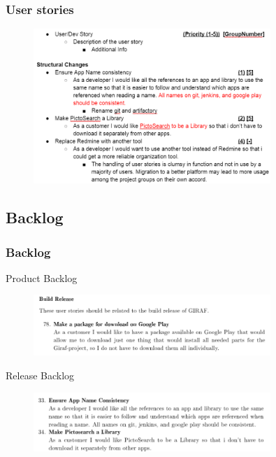\begin{frame}
	\begin{center}
		\frametitle{User stories}
		\begin{figure}[H]
			\centering
			\includegraphics[width=0.8\textwidth]{pictures/DriveStory.png}
		\end{figure}
	\end{center}
\end{frame}

\subsection{Backlog}

\begin{frame}
	\begin{center}
		\frametitle{Backlog}
		Product Backlog
		\begin{figure}[H]
			\centering
			\includegraphics[width=0.8\textwidth]{pictures/ProductStory.png}
		\end{figure}
		Release Backlog
		\begin{figure}[H]
			\centering
			\includegraphics[width=0.8\textwidth]{pictures/ReleaseStory.png}
		\end{figure}
	\end{center}
\end{frame}